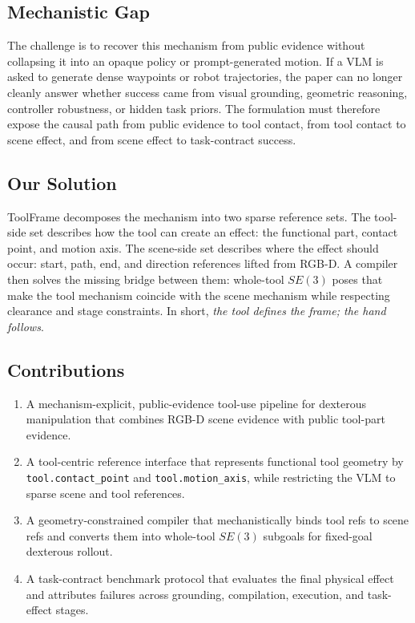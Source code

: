 \documentclass[letterpaper, 10 pt, conference]{ieeeconf}
\newcommand{\method}{ToolFrame}
\begin{document}
\subsection{Mechanistic Gap}
The challenge is to recover this mechanism from public evidence without
collapsing it into an opaque policy or prompt-generated motion. If a VLM is
asked to generate dense waypoints or robot trajectories, the paper can no
longer cleanly answer whether success came from visual grounding, geometric
reasoning, controller robustness, or hidden task priors. The formulation must
therefore expose the causal path from public evidence to tool contact, from
tool contact to scene effect, and from scene effect to task-contract success.

\subsection{Our Solution}
\method{} decomposes the mechanism into two sparse reference sets. The
tool-side set describes how the tool can create an effect: the functional part,
contact point, and motion axis. The scene-side set describes where the effect
should occur: start, path, end, and direction references lifted from RGB-D. A
compiler then solves the missing bridge between them: whole-tool $SE(3)$ poses
that make the tool mechanism coincide with the scene mechanism while respecting
clearance and stage constraints. In short, \emph{the tool defines the frame;
the hand follows}.

\subsection{Contributions}
\begin{enumerate}
  \item A mechanism-explicit, public-evidence tool-use pipeline for dexterous
  manipulation that combines RGB-D scene evidence with public tool-part
  evidence.
  \item A tool-centric reference interface that represents functional tool
  geometry by \texttt{tool.contact\_point} and
  \texttt{tool.motion\_axis}, while restricting the VLM to sparse scene and
  tool references.
  \item A geometry-constrained compiler that mechanistically binds tool refs to
  scene refs and converts them into whole-tool $SE(3)$ subgoals for fixed-goal
  dexterous rollout.
  \item A task-contract benchmark protocol that evaluates the final physical
  effect and attributes failures across grounding, compilation, execution, and
  task-effect stages.
\end{enumerate}
\end{document}
